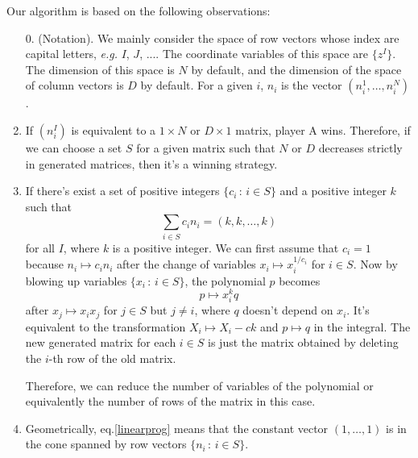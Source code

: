 \documentclass[12pt]{article}
\theoremstyle{definition}
\theoremstyle{plain}
\begin{document}
\vspace{2ex}

Our algorithm is based on the following observations:
\begin{enumerate}
	\item[0.](Notation). We mainly consider the space of row vectors whose index are 
	capital letters, \textit{e.g.} $I$, $J$, .... 
	The coordinate variables of this space are $\{z^I\}$.
	The dimension of this space is $N$ by default, and the dimension of the space
	of column vectors is $D$ by default. For a given $i$, $n_i$ is the vector
	$(n_i^1,\dots,n_i^N)$.
	
	\item If $(n^I_i)$ is equivalent to a $1\times N$ or $D\times 1$ matrix, player A wins. 
	Therefore, if we can choose a set $S$ for a given matrix such that $N$ or $D$ 
	decreases strictly in generated matrices, then it's a winning strategy.


	\item If there's exist a set of positive integers $\{c_i\,:\,i\in S\}$ and a 
	positive integer $k$ such that
	\begin{equation}\label{linearprog}
		\sum_{i\in S} c_i n_i = (k,k,\dots,k)
	\end{equation}	
	for all $I$, where $k$ is a positive integer. 
	We can first assume that $c_i=1$ because $n_i\mapsto c_i n_i$ after the 
	change of variables $x_i\mapsto x_i^{1/c_i}$ for $i\in S$.
	Now by blowing up variables $\{x_i\,:\, i\in S\}$, the polynomial $p$ becomes
	\[
		p\mapsto x_i^k q
	\]
	after $x_j\mapsto x_ix_j$ for $j\in S$ but $j\neq i$, where $q$ doesn't depend on $x_i$.
	It's equivalent to the transformation $X_i\mapsto X_i-ck$ and $p\mapsto q$ 
	in the integral. The new generated matrix for each $i\in S$ is just the matrix
	obtained by deleting the $i$-th row of the old matrix.
	
	Therefore, we can reduce the number of variables of the polynomial or equivalently 
	the number of rows of the matrix in this case.

	\item Geometrically, eq.\eqref{linearprog} means that the constant vector $(1,\dots,1)$ 
	is in the cone spanned by row vectors $\{n_i\,:\,i\in S\}$. 


\end{enumerate}
\end{document}
